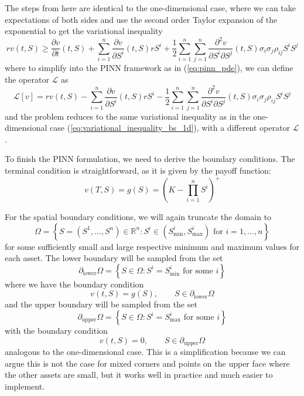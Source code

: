The steps from here are identical to the one-dimensional case, where we can take expectations of both sides and use the second order Taylor expansion of the exponential to get the variational inequality
\begin{equation}
    rv(t, S) \ge \frac{\partial v}{\partial t}(t, S) + \sum_{i=1}^n \frac{\partial v}{\partial S^i}(t, S) rS^i + \frac 12 \sum_{i=1}^n \sum_{j=1}^n \frac{\partial^2 v}{\partial S^i \partial S^j}(t, S) \sigma_i \sigma_j \rho_{ij} S^i S^j
\end{equation}
where to simplify into the PINN framework as in (\ref{eq:pinn_pde}), we can define the operator $\mathcal L$ as
\begin{equation}
    \mathcal L[v] = rv(t, S) - \sum_{i=1}^n \frac{\partial v}{\partial S^i}(t, S) rS^i - \frac 12 \sum_{i=1}^n \sum_{j=1}^n \frac{\partial^2 v}{\partial S^i \partial S^j}(t, S) \sigma_i \sigma_j \rho_{ij} S^i S^j
\label{eq:bs_operator_multi}
\end{equation}
and the problem reduces to the same variational inequality as in the one-dimensional case (\ref{eq:variational_inequality_bs_1d}), with a different operator $\mathcal L$.

To finish the PINN formulation, we need to derive the boundary conditions. The terminal condition is straightforward, as it is given by the payoff function:
\begin{equation}
    v(T, S) = g(S) = \left(K - \prod_{i=1}^n S^i\right)^+
\end{equation}

For the spatial boundary conditions, we will again truncate the domain to
\begin{equation}
    \Omega = \left \{
        S=(S^1, \dots, S^n) \in \mathbb R^n: S^i \in (S_\text{min}^i, S_\text{max}^i) \text{ for } i = 1, \dots, n
    \right \}
\end{equation}
for some sufficiently small and large respective minimum and maximum values for each asset. The lower boundary will be sampled from the set
\begin{equation}
    \partial_\text{lower} \Omega = \left\{
        S \in \Omega: S^i = S_\text{min}^i \text{ for some } i
    \right\}
\end{equation}
where we have the boundary condition
\begin{equation}
    v(t, S) = g(S), \qquad S \in \partial_\text{lower} \Omega
\end{equation}
and the upper boundary will be sampled from the set
\begin{equation}
    \partial_\text{upper} \Omega = \left\{
    S \in \Omega: S^i = S_\text{max}^i \text{ for some } i
    \right\}
\end{equation}
with the boundary condition
\begin{equation}
    v(t, S) = 0, \qquad S \in \partial_\text{upper} \Omega
\end{equation}
analogous to the one-dimensional case. This is a simplification because we can argue this is not the case for mixed corners and points on the upper face where the other assets are small, but it works well in practice and much easier to implement.

